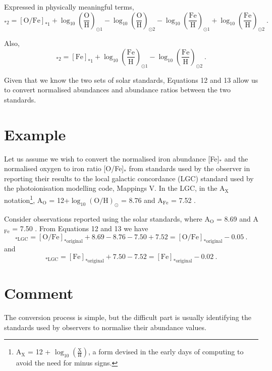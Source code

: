 Expressed in physically meaningful terms,
\begin{equation}
[\text{O}/\text{Fe}]_{*2} = [\text{O}/\text{Fe}]_{*1} + \log_{10}\left(\frac{\text{O}}{\text{H}}\right)_{\odot 1} - \log_{10}\left(\frac{\text{O}}{\text{H}}\right)_{\odot 2} - \log_{10}\left(\frac{\text{Fe}}{\text{H}}\right)_{\odot 1} + \log_{10}\left(\frac{\text{Fe}}{\text{H}}\right)_{\odot 2} \ .
\end{equation}

Also,
\begin{equation}
[\text{Fe}]_{*2} = [\text{Fe}]_{*1} + \log_{10}\left(\frac{\text{Fe}}{\text{H}}\right)_{\odot 1} - \log_{10}\left(\frac{\text{Fe}}{\text{H}}\right)_{\odot 2} \ .
\end{equation}

Given that we know the two sets of solar standards, Equations 12 and 13 allow us to convert normalised abundances and abundance ratios between the two standards.

\section{Example}
Let us assume we wish to convert the normalised iron abundance [Fe]$_*$ and the normalised oxygen to iron ratio [O/Fe]$_*$ from standards used by the observer in reporting their results to the local galactic concordance (LGC) standard used by the photoionisation modelling code, Mappings V.  In the LGC, in the A$_\text{X}$ notation\footnote{ A$_\text{X}$ = 12 + $\log_{10}(\frac{\text{X}}{\text{H}})$, a form devised in the early days of computing to avoid the need for minus signs.}, A$_\text{O}$ = 12+$\log_{10}(\text{O/H})_\odot$ = 8.76 and A$_\text{Fe}$ = 7.52 .

Consider observations reported using the \cite{2009ARA&A..47..481A} solar standards, where A$_\text{O}$ = 8.69 and A$_\text{Fe}$ = 7.50 . From Equations 12 and 13 we have
\begin{equation}
[\text{O}/\text{Fe}]_{*\text{LGC}} = [\text{O}/\text{Fe}]_{*\text{original}} + 8.69 - 8.76 - 7.50 + 7.52 = [\text{O}/\text{Fe}]_{*\text{original}} -0.05 \ .
\end{equation}
and
\begin{equation}
[\text{Fe}]_{*\text{LGC}} = [\text{Fe}]_{*\text{original}} + 7.50 - 7.52 = [\text{Fe}]_{*\text{original}} - 0.02 \ .
\end{equation}

\section{Comment}
The conversion process is simple, but the difficult part is usually identifying the standards used by observers to normalise their abundance values.

  
  
  
  
  
  
  
  
  
  
  
  
  
  
  
  
  
  
  
  